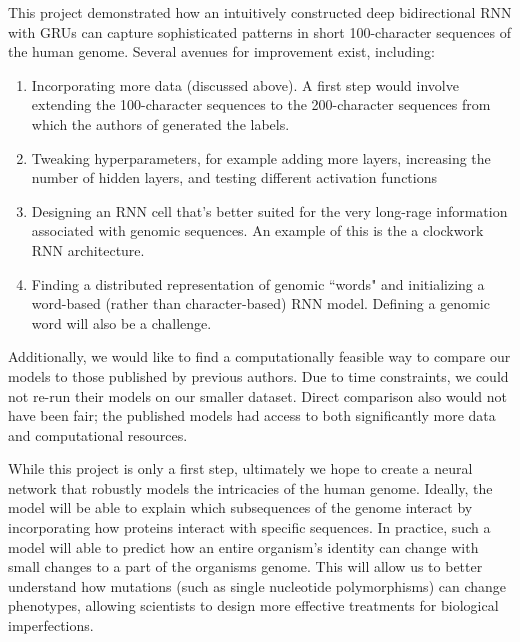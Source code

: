 \documentclass{article} %
\begin{document}
This project demonstrated how an intuitively constructed deep bidirectional RNN with GRUs can capture sophisticated patterns in short 100-character sequences of the human genome. Several avenues for improvement exist, including:
\begin{enumerate}
	\item Incorporating more data (discussed above). A first step would involve extending the 100-character sequences to the 200-character sequences from which the authors of \cite{zhou2015predicting} generated the labels. 
	\item Tweaking hyperparameters, for example adding more layers, increasing the number of hidden layers, and testing different activation functions
	\item Designing an RNN cell that's better suited for the very long-rage information associated with genomic sequences. An example of this is the a clockwork RNN \cite{koutnik2014clockwork} architecture.
	\item Finding a distributed representation of genomic ``words" and initializing a word-based (rather than character-based) RNN model. Defining a genomic word will also be a challenge.
\end{enumerate}

Additionally, we would like to find a computationally feasible way to compare our models to those published by previous authors. Due to time constraints, we could not re-run their models on our smaller dataset. Direct comparison also would not have been fair; the published models had access to both significantly more data and computational resources.

While this project is only a first step, ultimately we hope to create a neural network that robustly models the intricacies of the human genome. Ideally, the model will be able to explain which subsequences of the genome interact by incorporating how proteins interact with specific sequences. In practice, such a model will able to predict how an entire organism's identity can change with small changes to a part of the organisms genome. This will allow us to better understand how mutations (such as single nucleotide polymorphisms) can change phenotypes, allowing scientists to design more effective treatments for biological imperfections.
 


\end{document}
